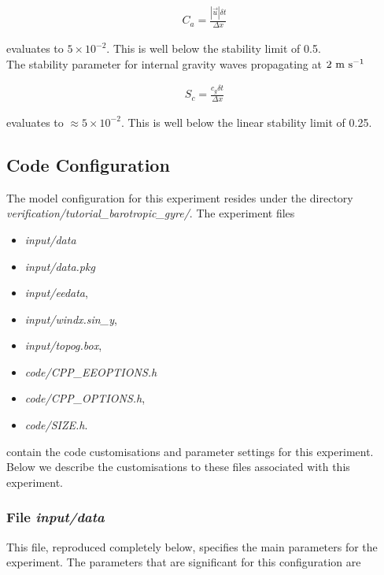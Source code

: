 \begin{eqnarray}
\label{eq:eg-fourlayer-cfl_stability}
C_{a} = \frac{| \vec{u} | \delta t}{ \Delta x}
\end{eqnarray}

\noindent evaluates to $5 \times 10^{-2}$. This is well below the stability 
limit of 0.5.
\\

\noindent The stability parameter for internal gravity waves
propagating at $2~{\rm m}~{\rm s}^{-1}$ 

\begin{eqnarray}
\label{eq:eg-fourlayer-igw_stability}
S_{c} = \frac{c_{g} \delta t}{ \Delta x}
\end{eqnarray}

\noindent evaluates to $\approx 5 \times 10^{-2}$. This is well below the linear
stability limit of 0.25.
  
\subsection{Code Configuration}
\label{sec:eg_fourl_code_config}

The model configuration for this experiment resides under the 
directory {\it verification/tutorial\_barotropic\_gyre/}.
The experiment files 
\begin{itemize}
\item {\it input/data}
\item {\it input/data.pkg}
\item {\it input/eedata},
\item {\it input/windx.sin\_y},
\item {\it input/topog.box},
\item {\it code/CPP\_EEOPTIONS.h}
\item {\it code/CPP\_OPTIONS.h},
\item {\it code/SIZE.h}. 
\end{itemize}
contain the code customisations and parameter settings for this
experiment. Below we describe the customisations to these files
associated with this experiment.

\subsubsection{File {\it input/data}}

This file, reproduced completely below, specifies the main parameters 
for the experiment. The parameters that are significant for this configuration
are

